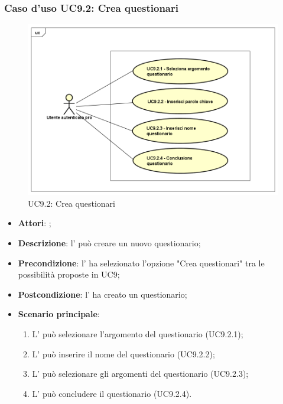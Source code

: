 	\subsubsection{Caso d'uso UC9.2: Crea questionari}
	\label{UC9.2}
	\begin{figure}[h]
		\centering
	\includegraphics[scale=0.5,keepaspectratio]{UML/UC9_2.png}
		\caption{UC9.2: Crea questionari}
	\end{figure}
	\FloatBarrier
	\begin{itemize}
		\item \textbf{Attori}: \uaupro{};
		\item \textbf{Descrizione}: l'\uaupro{} può creare un nuovo questionario; 
		\item \textbf{Precondizione}: l'\uaupro{} ha selezionato l'opzione "Crea questionari" tra le possibilità proposte in UC9;
		\item \textbf{Postcondizione}: l'\uaupro{} ha creato un questionario;
		\item \textbf{Scenario principale}:
			\begin{enumerate}
				\item L'\uaupro{} può selezionare l'argomento del questionario (UC9.2.1);
				\item L'\uaupro{} può inserire il nome del questionario (UC9.2.2);
				\item L'\uaupro{} può selezionare gli argomenti del questionario (UC9.2.3);
				\item L'\uaupro{} può concludere il questionario (UC9.2.4).
			\end{enumerate}
		\end{itemize}
	
